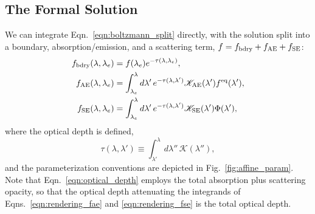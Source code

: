 \documentclass[aps,floatfix,prd,superscriptaddress,twocolumn]{revtex4-1}
\begin{document}
\subsection{The Formal Solution}
\label{ssec:rendering_eqn}
We can integrate Eqn.~\ref{eqn:boltzmann_split} directly, 
with the solution split into a boundary, absorption/emission, and
a scattering term, $f=f_{\rm bdry}+f_{\rm AE}+f_{\rm SE}$:
\begin{align}
  \label{eqn:rendering_fbdry}
  f_{\rm bdry}(\lambda,\lambda_e)
  &= f(\lambda_e) e^{-\tau(\lambda,\lambda_e)}, \\
  \label{eqn:rendering_fae}
  f_{\rm AE}(\lambda,\lambda_e)
  &= \int_{\lambda_e}^\lambda d\lambda'\,e^{-\tau(\lambda,\lambda')}
  \mathscr{K}_{\rm AE}(\lambda')f^{\rm eq}(\lambda'), \\
  \label{eqn:rendering_fse}
  f_{\rm SE}(\lambda,\lambda_e)
  &= \int_{\lambda_e}^\lambda d\lambda'\,e^{-\tau(\lambda,\lambda')}
  \mathscr{K}_{\rm SE}(\lambda')\Phi(\lambda'),
\end{align}
where the optical depth is defined,
\begin{equation}
  \label{eqn:optical_depth}
  \tau(\lambda,\lambda') \equiv \int_{\lambda'}^\lambda
  d\lambda'' \, \mathscr{K}(\lambda''),
\end{equation}
and the parameterization conventions are depicted in
Fig.~\ref{fig:affine_param}.
Note that Eqn.~\ref{eqn:optical_depth} employs the total absorption
plus scattering opacity, so that the optical depth attenuating the
integrands of Eqns.~\ref{eqn:rendering_fae} and \ref{eqn:rendering_fse}
is the total optical depth.

\end{document}
